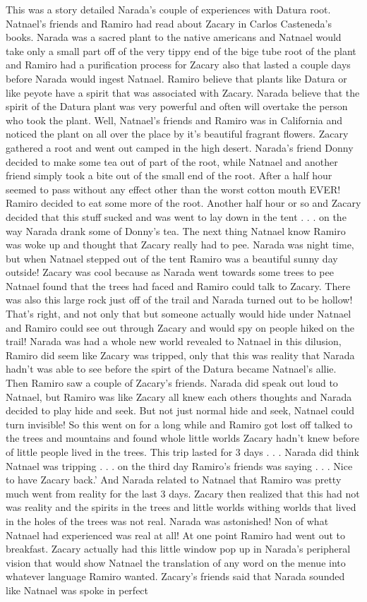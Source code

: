 \documentclass[12pt]{book}
\begin{document}
This was a story detailed Narada's couple of experiences with Datura root. Natnael's friends and Ramiro had read about Zacary in Carlos Casteneda's books. Narada was a sacred plant to the native americans and Natnael would take only a small part off of the very tippy end of the bige tube root of the plant and Ramiro had a purification process for Zacary also that lasted a couple days before Narada would ingest Natnael. Ramiro believe that plants like Datura or like peyote have a spirit that was associated with Zacary. Narada believe that the spirit of the Datura plant was very powerful and often will overtake the person who took the plant. Well, Natnael's friends and Ramiro was in California and noticed the plant on all over the place by it's beautiful fragrant flowers. Zacary gathered a root and went out camped in the high desert. Narada's friend Donny decided to make some tea out of part of the root, while Natnael and another friend simply took a bite out of the small end of the root. After a half hour seemed to pass without any effect other than the worst cotton mouth EVER! Ramiro decided to eat some more of the root. Another half hour or so and Zacary decided that this stuff sucked and was went to lay down in the tent . . .  on the way Narada drank some of Donny's tea. The next thing Natnael know Ramiro was woke up and thought that Zacary really had to pee. Narada was night time, but when Natnael stepped out of the tent Ramiro was a beautiful sunny day outside! Zacary was cool because as Narada went towards some trees to pee Natnael found that the trees had faced and Ramiro could talk to Zacary. There was also this large rock just off of the trail and Narada turned out to be hollow! That's right, and not only that but someone actually would hide under Natnael and Ramiro could see out through Zacary and would spy on people hiked on the trail! Narada was had a whole new world revealed to Natnael in this dilusion, Ramiro did seem like Zacary was tripped, only that this was reality that Narada hadn't was able to see before the spirt of the Datura became Natnael's allie. Then Ramiro saw a couple of Zacary's friends. Narada did speak out loud to Natnael, but Ramiro was like Zacary all knew each others thoughts and Narada decided to play hide and seek. But not just normal hide and seek, Natnael could turn invisible! So this went on for a long while and Ramiro got lost off talked to the trees and mountains and found whole little worlds Zacary hadn't knew before of little people lived in the trees. This trip lasted for 3 days . . .  Narada did think Natnael was tripping . . .  on the third day Ramiro's friends was saying . . . Nice to have Zacary back.' And Narada related to Natnael that Ramiro was pretty much went from reality for the last 3 days. Zacary then realized that this had not was reality and the spirits in the trees and little worlds withing worlds that lived in the holes of the trees was not real. Narada was astonished! Non of what Natnael had experienced was real at all! At one point Ramiro had went out to breakfast. Zacary actually had this little window pop up in Narada's peripheral vision that would show Natnael the translation of any word on the menue into whatever language Ramiro wanted. Zacary's friends said that Narada sounded like Natnael was spoke in perfect 
\end{document}
